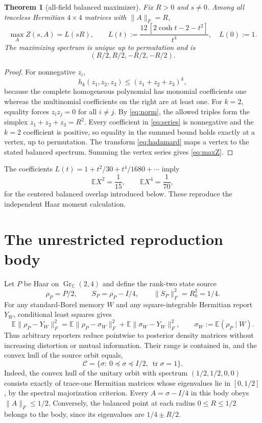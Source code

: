 \documentclass[11pt,a4paper]{article}
\newtheorem{theorem}{Theorem}[section]
\newcommand{\Gr}{\operatorname{Gr}_{\mathbb C}}
\newcommand{\tr}{\operatorname{tr}}
\newcommand{\E}{\mathbb E}
\newcommand{\cC}{\mathcal C}
\begin{document}
\begin{theorem}[all-field balanced maximizer]\label{thm:allfield}
Fix $R>0$ and $s\ne0$.  Among all traceless Hermitian $4\times4$ matrices with $\lVert A\rVert_F=R$,
\begin{equation}\label{eq:maxZ}
\max_A Z(s,A)=L(sR),\qquad
L(t):=\frac{12\,[2\cosh t-2-t^2]}{t^4},\quad L(0):=1.
\end{equation}
The maximizing spectrum is unique up to permutation and is
\[
(R/2,R/2,-R/2,-R/2).
\]
\end{theorem}

\begin{proof}
For nonnegative $z_i$,
\[
h_k(z_1,z_2,z_3)\le(z_1+z_2+z_3)^k,
\]
because the complete homogeneous polynomial has monomial coefficients one whereas the multinomial coefficients on the right are at least one.  For $k=2$, equality forces $z_iz_j=0$ for all $i\ne j$.  By \cref{eq:norm}, the allowed triples form the simplex $z_1+z_2+z_3=R^2$.  Every coefficient in \cref{eq:series} is nonnegative and the $k=2$ coefficient is positive, so equality in the summed bound holds exactly at a vertex, up to permutation.  The transform \cref{eq:hadamard} maps a vertex to the stated balanced spectrum.  Summing the vertex series gives \cref{eq:maxZ}.
\end{proof}

The coefficients $L(t)=1+t^2/30+t^4/1680+\cdots$ imply
\begin{equation}\label{eq:moments}
\E X^2=\frac1{15},\qquad \E X^4=\frac1{70},
\end{equation}
for the centered balanced overlap introduced below.  These reproduce the independent Haar moment calculation.

\section{The unrestricted reproduction body}

Let $P$ be Haar on $\Gr(2,4)$ and define the rank-two state source
\[
\rho_P=P/2,\qquad S_P=\rho_P-I/4,\qquad \lVert S_P\rVert_F^2=R_0^2=1/4.
\]
For any standard-Borel memory $W$ and any square-integrable Hermitian report $Y_W$, conditional least squares gives
\begin{equation}\label{eq:pythagoras}
\E\lVert\rho_P-Y_W\rVert_F^2
=\E\lVert\rho_P-\sigma_W\rVert_F^2+\E\lVert\sigma_W-Y_W\rVert_F^2,
\qquad \sigma_W:=\E(\rho_P\mid W).
\end{equation}
Thus arbitrary reporters reduce pointwise to posterior density matrices without increasing distortion or mutual information.  Their range is contained in, and the convex hull of the source orbit equals,
\begin{equation}\label{eq:body}
\cC=\{\sigma:\ 0\preceq\sigma\preceq I/2,\ \tr\sigma=1\}.
\end{equation}
Indeed, the convex hull of the unitary orbit with spectrum $(1/2,1/2,0,0)$ consists exactly of trace-one Hermitian matrices whose eigenvalues lie in $[0,1/2]$, by the spectral majorization criterion.  Every $A=\sigma-I/4$ in this body obeys $\lVert A\rVert_F\le1/2$.  Conversely, the balanced point at each radius $0\le R\le1/2$ belongs to the body, since its eigenvalues are $1/4\pm R/2$.
\end{document}
